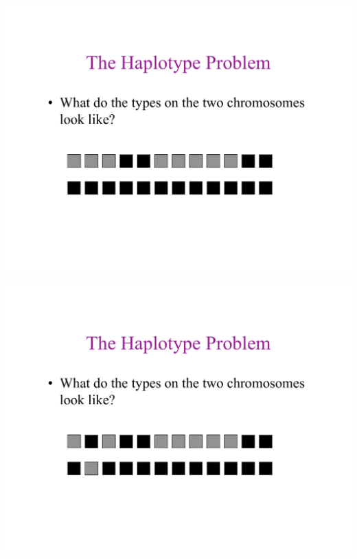 \newslide{}
\mbox{}
\vspace*{\VertUp}
\enlargethispage*{1000pt}
\begin{center}
\includegraphics*[width=\textwidth]{PPT_pages/pg_0005.pdf}
\end{center}


\newslide{}
\mbox{}
\vspace*{\VertUp}
\enlargethispage*{1000pt}
\begin{center}
\includegraphics*[width=\textwidth]{PPT_pages/pg_0006.pdf}
\end{center}


